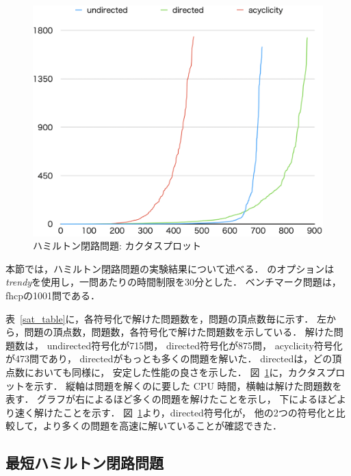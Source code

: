 \begin{figure}[tb]
\begin{center}
  \includegraphics[width=0.8\linewidth]{fig/cactus_fhcp.png}
\caption{ハミルトン閉路問題: カクタスプロット}
\label{cactus}
\end{center}
\end{figure}


本節では，ハミルトン閉路問題の実験結果について述べる．
{\clingo}のオプションは\textit{trendy}を使用し，一問あたりの時間制限を30分とした．
ベンチマーク問題は，\textsf{fhcp}の1001問である．

表~\ref{sat_table}に，各符号化で解けた問題数を，問題の頂点数毎に示す．
左から，問題の頂点数，問題数，各符号化で解けた問題数を示している．
%
解けた問題数は，
\textsf{undirected}符号化が715問，
\textsf{directed}符号化が875問，
\textsf{acyclicity}符号化が473問であり，
\textsf{directed}がもっとも多くの問題を解いた．
\textsf{directed}は，どの頂点数においても同様に，
安定した性能の良さを示した．
図~\ref{cactus}に，カクタスプロットを示す．
縦軸は問題を解くのに要した CPU 時間，横軸は解けた問題数を表す．
グラフが右によるほど多くの問題を解けたことを示し，
下によるほどより速く解けたことを示す．
図~\ref{cactus}より，\textsf{directed}符号化が，
他の2つの符号化と比較して，より多くの問題を高速に解いていることが確認できた．

\subsection{最短ハミルトン閉路問題}

